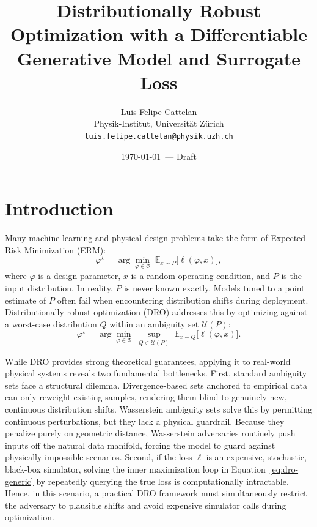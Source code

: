 \documentclass[11pt]{article}
\title{Distributionally Robust Optimization with a Differentiable\\
Generative Model and Surrogate Loss}
\author{Luis Felipe Cattelan \\ \small Physik-Institut, Universit\"at Z\"urich \\ \small \texttt{luis.felipe.cattelan@physik.uzh.ch}}
\date{\today\ --- Draft}
\newcommand{\E}{\mathbb{E}}
\newcommand{\Phibox}{\Phi}
\newcommand{\design}{\varphi}
\newcommand{\amb}{\mathcal{U}}
\begin{document}
\maketitle

\begin{abstract}
\end{abstract}

\section{Introduction}

Many machine learning and physical design problems take the form of Expected Risk Minimization (ERM):
\begin{equation}
  \label{eq:erm}
  \design^\star = \arg\min_{\design \in \Phibox} \; \E_{x \sim P}\big[\ell(\design, x)\big],
\end{equation}
where $\design$ is a design parameter, $x$ is a random operating condition, and $P$ is the input distribution. In reality, $P$ is never known exactly. Models tuned to a point estimate of $P$ often fail when encountering distribution shifts during deployment. Distributionally robust optimization (DRO) addresses this by optimizing against a worst-case distribution $Q$ within an ambiguity set $\amb(P)$:
\begin{equation}
  \label{eq:dro-generic}
  \design^\star = \arg\min_{\design \in \Phibox} \; \sup_{Q \in \amb(P)} \; \E_{x \sim Q}\big[\ell(\design, x)\big].
\end{equation}

While DRO provides strong theoretical guarantees, applying it to real-world physical systems reveals two fundamental bottlenecks. First, standard ambiguity sets face a structural dilemma. Divergence-based sets anchored to empirical data can only reweight existing samples, rendering them blind to genuinely new, continuous distribution shifts. Wasserstein ambiguity sets solve this by permitting continuous perturbations, but they lack a physical guardrail. Because they penalize purely on geometric distance, Wasserstein adversaries routinely push inputs off the natural data manifold, forcing the model to guard against physically impossible scenarios. Second, if the loss $\ell$ is an expensive, stochastic, black-box simulator, solving the inner maximization loop in Equation~\ref{eq:dro-generic} by repeatedly querying the true loss is computationally intractable. Hence, in this scenario, a practical DRO framework must simultaneously restrict the adversary to plausible shifts and avoid expensive simulator calls during optimization. 
\end{document}
